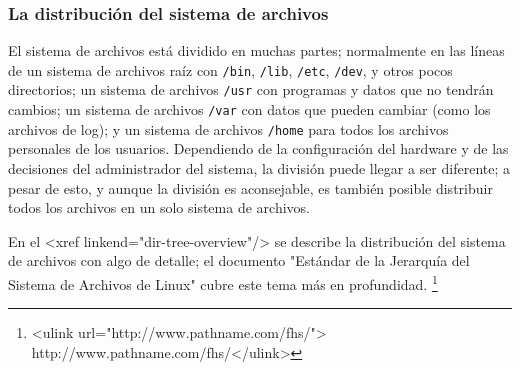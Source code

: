 \subsubsection{ La distribución del sistema de archivos}

 El sistema de archivos está dividido en muchas partes; normalmente en las
líneas de un sistema de archivos raíz con \texttt{/bin},
\texttt{/lib}, \texttt{/etc}, \texttt{/dev},
y otros pocos directorios; un sistema de archivos \texttt{/usr} con programas y datos que
no tendrán cambios; un sistema de archivos \texttt{/var} con datos que pueden cambiar
(como los archivos de log); y un sistema de archivos \texttt{/home}
para todos los archivos personales de los usuarios. Dependiendo de la
configuración del hardware y de las decisiones del administrador del sistema, la
división puede llegar a ser diferente; a pesar de esto, y aunque la división es
aconsejable, es también posible distribuir todos los archivos en un solo sistema
de archivos.  

 En el <xref linkend="dir-tree-overview"/> se describe la distribución del sistema de archivos con
algo de detalle; el documento "Estándar de la Jerarquía del Sistema de Archivos
de Linux" cubre este tema más en profundidad.
\footnote{<ulink url="http://www.pathname.com/fhs/">
	http://www.pathname.com/fhs/</ulink>}  

 





